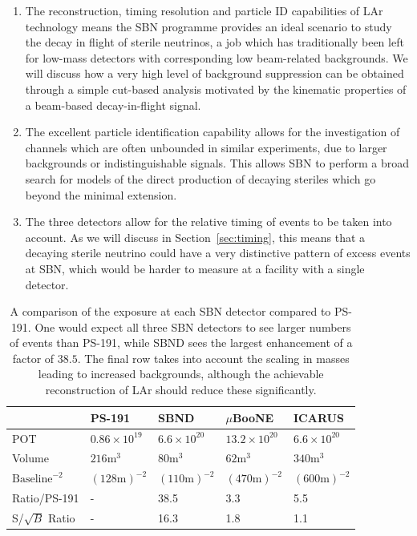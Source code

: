 \documentclass[11pt, a4paper]{article}
\newcommand{\refsec}[1]{Section~\ref{#1}}
\begin{document}
\begin{enumerate}

\item The reconstruction, timing resolution and particle ID capabilities of LAr
technology means the SBN programme provides an ideal scenario to study the
decay in flight of sterile neutrinos, a job which has traditionally been left
for low-mass detectors with corresponding low beam-related backgrounds. 
%
We will discuss how a very high level of background suppression can be obtained
through a simple cut-based analysis motivated by the kinematic properties of a
beam-based decay-in-flight signal. 

\item The excellent particle identification capability allows for the
investigation of channels which are often unbounded in similar experiments, due
to larger backgrounds or indistinguishable signals. This allows SBN to perform
a broad search for models of the direct production of decaying steriles which
go beyond the minimal extension.

\item The three detectors allow for the relative timing of events to be taken
into account. As we will discuss in \refsec{sec:timing}, this means that a
decaying sterile neutrino could have a very distinctive pattern of excess
events at SBN, which would be harder to measure at a facility with a single
detector.

\end{enumerate} 

\begin{table}[t!]
\centering
\begin{tabular}{| l || l | l | l | l |}
	\hline
	& PS-191 & SBND & $\mu$BooNE & ICARUS \\ \hline \hline
	POT	& $0.86 \times 10^{19}$	& $6.6 \times 10^{20}$	&	$13.2 \times 10^{20}$     &  $6.6 \times 10^{20}$ \\ \hline
	Volume	& $216\text{m}^3$	&	$80\text{m}^3$	&	$62\text{m}^3$	     &   $340\text{m}^3$	\\ \hline
	$\text{Baseline}^{-2}$	& $(128 	\text{m} )^{-2}$	&$(110 \text{m} )^{-2}$	&	$(470 \text{m} )^{-2}$			     & $(600 \text{m} )^{-2}$	  \\ \hline
Ratio/PS-191 & - 	& 38.5 	& 3.3	& 5.5\\ \hline
	S/$\sqrt{B}$ Ratio & - 	& 16.3 	& 1.8	& 1.1\\ \hline
\end{tabular}

\caption{\label{tab:exposure} A comparison of the exposure at each SBN detector
compared to PS-191. One would expect all  three SBN detectors to see larger
numbers of events than PS-191, while SBND sees the largest enhancement of a
factor of $38.5$. The final row takes into account the scaling in masses
leading to increased backgrounds, although the achievable reconstruction of LAr
should reduce these significantly.}

\end{table}
\end{document}
